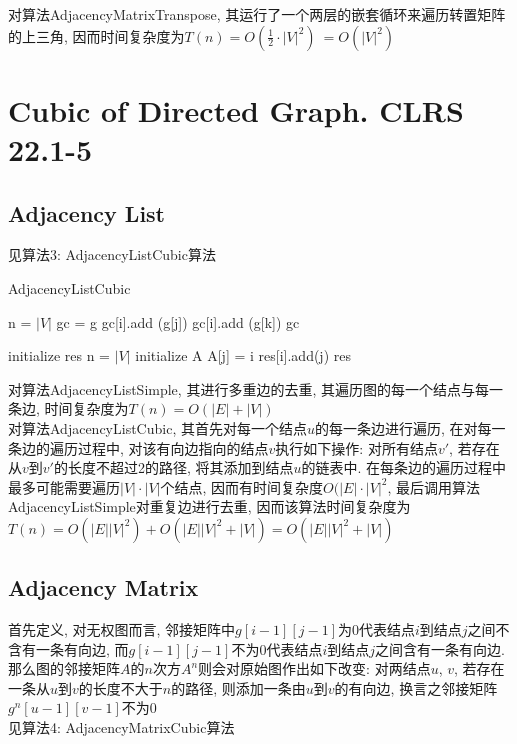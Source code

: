 \documentclass{article}
\begin{document}
对算法AdjacencyMatrixTranspose, 其运行了一个两层的嵌套循环来遍历转置矩阵的上三角, 因而时间复杂度为$T(n) = O(\frac{1}{2} \cdot |V|^2)\ = O(|V|^2)$


\section{Cubic of Directed Graph. CLRS 22.1-5}
\subsection{Adjacency List}
见算法3: AdjacencyListCubic算法

\begin{algorithm}
\caption{AdjacencyListCubic}
\begin{algorithmic}[1]
\State n = $|V|$
\State gc = g
\State gc[i].add (g[j]) 
\State gc[i].add (g[k]) 
\EndFor
\EndFor
\EndFor
\State {}
\State \Return gc
\EndProcedure

\State initialize res 
\State n = $|V|$
\State initialize A 
\State A[j] = i
\State res[i].add(j)
\EndIf
\EndFor
\EndFor
\State \Return res
\EndProcedure
\end{algorithmic}
\end{algorithm}

对算法AdjacencyListSimple, 其进行多重边的去重, 其遍历图的每一个结点与每一条边, 时间复杂度为$T(n) = O(|E| + |V|)$ \\
对算法AdjacencyListCubic, 其首先对每一个结点$u$的每一条边进行遍历, 在对每一条边的遍历过程中, 对该有向边指向的结点$v$执行如下操作: 对所有结点$v'$, 若存在从$v$到$v'$的长度不超过2的路径, 将其添加到结点$u$的链表中. 在每条边的遍历过程中最多可能需要遍历$|V| \cdot |V|$个结点, 因而有时间复杂度$O(|E| \cdot |V|^2$, 最后调用算法AdjacencyListSimple对重复边进行去重, 因而该算法时间复杂度为$T(n) = O(|E||V|^2) + O(|E||V|^2+|V|) = O(|E||V|^2+|V|)$

\subsection{Adjacency Matrix}
首先定义, 对无权图而言, 邻接矩阵中$g[i-1][j-1]$为$0$代表结点$i$到结点$j$之间不含有一条有向边, 而$g[i-1][j-1]$不为$0$代表结点$i$到结点$j$之间含有一条有向边. \\
那么图的邻接矩阵$A$的$n$次方$A^n$则会对原始图作出如下改变: 对两结点$u$, $v$, 若存在一条从$u$到$v$的长度不大于$n$的路径, 则添加一条由$u$到$v$的有向边, 换言之邻接矩阵$g^n[u-1][v-1]$不为0 \\
见算法4: AdjacencyMatrixCubic算法
\end{document}
